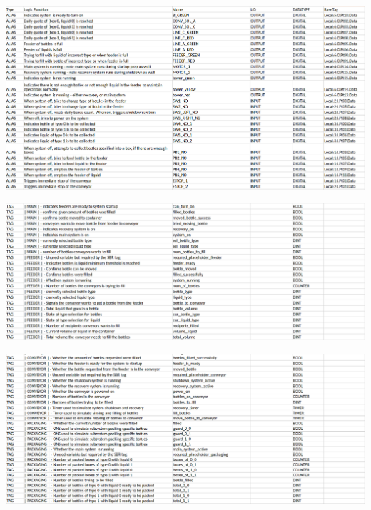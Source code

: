 \hspace{-3cm}\includegraphics[scale=0.55]{../external/dev_spr_1.png}

\hspace{-3cm}\includegraphics[scale=0.55]{../external/dev_spr_2.png}

\hspace{-3cm}\includegraphics[scale=0.55]{../external/dev_spr_3.png}

